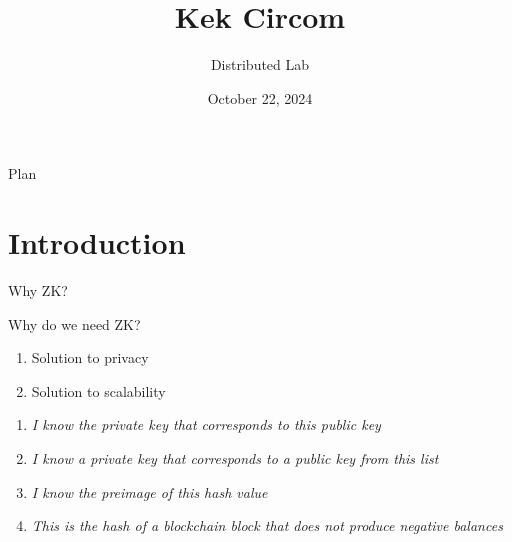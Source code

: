 \documentclass{zkdl-presentation-template}
\title[Circom]{\textbf{Kek Circom}}
\author{Distributed Lab}
\date{October 22, 2024}
\begin{document}

    \begin{frame}{Plan}
        \tableofcontents
    \end{frame}


    \section{Introduction}

    \begin{frame}{Why ZK?}
        \pause

        \begin{block}{Why do we need ZK?}
            \begin{enumerate}
                \item Solution to privacy
                \item Solution to scalability
            \end{enumerate}
        \end{block}

        \pause

        \begin{example}
            \begin{enumerate}
                \item \textit{I know the private key that corresponds to this public key}
                \item \textit{I know a private key that corresponds to a public key from this list}
                \item \textit{I know the preimage of this hash value}
                \item \textit{This is the hash of a blockchain block that does not produce negative balances}
            \end{enumerate}
        \end{example}
    \end{frame}
\end{document}
